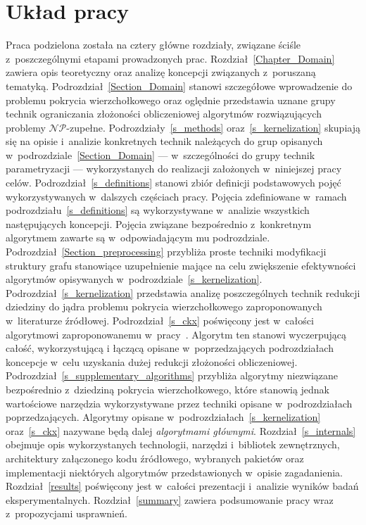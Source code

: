 \section{Układ pracy}\label{Section_Layout}
\par{
  Praca podzielona została na cztery główne rozdziały, związane ściśle z~poszczególnymi etapami prowadzonych prac.
  Rozdział~\ref{Chapter_Domain} zawiera opis teoretyczny oraz analizę koncepcji związanych z~poruszaną tematyką.
  Podrozdział~\ref{Section_Domain} stanowi szczegółowe wprowadzenie do problemu pokrycia wierzchołkowego oraz oględnie przedstawia uznane grupy technik ograniczania złożoności obliczeniowej algorytmów rozwiązujących problemy $\mathcal{NP}$-zupełne.
  Podrozdziały~\ref{s_methods} oraz~\ref{s_kernelization} skupiają się na opisie i~analizie konkretnych technik należących do grup opisanych w~podrozdziale~\ref{Section_Domain} --- w~szczególności do grupy technik parametryzacji --- wykorzystanych do realizacji założonych w~niniejszej pracy celów.
  Podrozdział~\ref{s_definitions} stanowi zbiór definicji podstawowych pojęć wykorzystywanych w~dalszych częściach pracy.
  Pojęcia zdefiniowane w~ramach podrozdziału~\ref{s_definitions} są wykorzystywane w~analizie wszystkich następujących koncepcji.
  Pojęcia związane bezpośrednio z~konkretnym algorytmem zawarte są w~odpowiadającym mu podrozdziale.
  Podrozdział~\ref{Section_preprocessing} przybliża proste techniki modyfikacji struktury grafu stanowiące uzupełnienie mające na celu zwiększenie efektywności algorytmów opisywanych w~podrozdziale~\ref{s_kernelization}.
  Podrozdział~\ref{s_kernelization} przedstawia analizę poszczególnych technik redukcji dziedziny do jądra problemu pokrycia wierzchołkowego zaproponowanych w~literaturze źródłowej.
  Podrozdział~\ref{s_ckx} poświęcony jest w~całości algorytmowi zaproponowanemu w~pracy~\cite{ImprovedBounds10}.
  Algorytm ten stanowi wyczerpującą całość, wykorzystującą i łączącą opisane w~poprzedzających podrozdziałach koncepcje w~celu uzyskania dużej redukcji złożoności obliczeniowej.
  Podrozdział~\ref{s_supplementary_algorithms} przybliża algorytmy niezwiązane bezpośrednio z~dziedziną pokrycia wierzchołkowego, które stanowią jednak wartościowe narzędzia wykorzystywane przez techniki opisane w~podrozdziałach poprzedzających.
  Algorytmy opisane w~podrozdziałach~\ref{s_kernelization} oraz~\ref{s_ckx} nazywane będą dalej \emph{algorytmami głównymi}.
  Rozdział~\ref{s_internals} obejmuje opis wykorzystanych technologii, narzędzi i~bibliotek zewnętrznych, architektury załączonego kodu źródłowego, wybranych pakietów oraz implementacji niektórych algorytmów przedstawionych w~opisie zagadanienia.
  Rozdział~\ref{results} poświęcony jest w~całości prezentacji i~analizie wyników badań eksperymentalnych.
  Rozdział~\ref{summary} zawiera podsumowanie pracy wraz z~propozycjami usprawnień.
}
